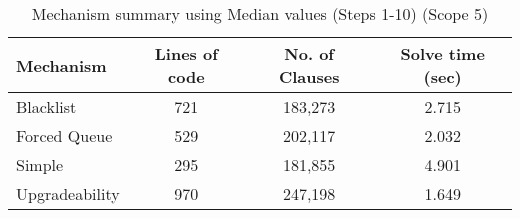\begin{table}[htbp]
\centering
\begin{tabular}{|l|c|c|c|}
\hline
\textbf{Mechanism} & \textbf{Lines of code} & \textbf{No. of Clauses} & \textbf{Solve time (sec)} \\
\hline
Blacklist & 721 & 183,273 & 2.715 \\
Forced Queue & 529 & 202,117 & 2.032 \\
Simple & 295 & 181,855 & 4.901 \\
Upgradeability & 970 & 247,198 & 1.649 \\
\hline
\end{tabular}
\caption{Mechanism summary using Median values (Steps 1-10) (Scope 5)}
\label{tab:mechanism_summary_median_steps_10}
\end{table}